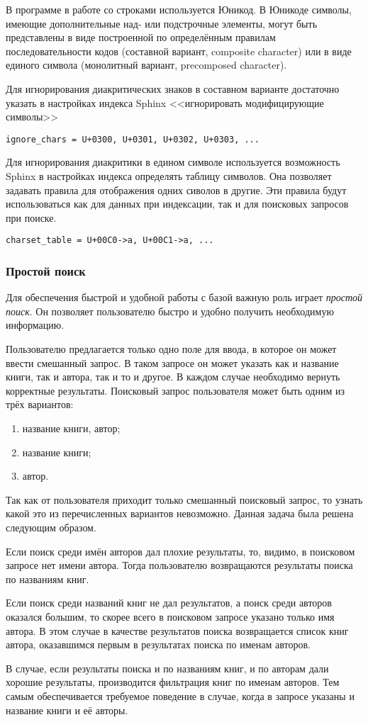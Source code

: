 В программе в работе со строками используется Юникод.
В Юникоде символы, имеющие дополнительные над- или подстрочные элементы, 
могут быть представлены в виде построенной по определённым правилам последовательности кодов (составной вариант, composite character) \cite{compositechar} 
или в виде единого символа (монолитный вариант, precomposed character).

Для игнорирования диакритических знаков в составном варианте достаточно указать в настройках индекса Sphinx <<игнорировать модифицирующие символы>>
\begin{verbatim}
ignore_chars = U+0300, U+0301, U+0302, U+0303, ...
\end{verbatim}
Для игнорирования диакритики в едином символе используется возможность Sphinx в настройках индекса определять таблицу символов. Она позволяет задавать правила для отображения одних сиволов в другие.
Эти правила будут использоваться как для данных при индексации, так и для поисковых запросов при поиске.
\begin{verbatim}
charset_table = U+00C0->a, U+00C1->a, ...
\end{verbatim}

\subsubsection{Простой поиск}

Для обеспечения быстрой и удобной работы с базой важную роль играет {\em простой поиск}.
Он позволяет пользователю быстро и удобно получить необходимую информацию.

Пользователю предлагается только одно поле для ввода, в которое он может ввести смешанный запрос.
В таком запросе он может указать как и название книги, так и автора, так и то и другое.
В каждом случае необходимо вернуть корректные результаты.
Поисковый запрос пользователя может быть одним из трёх вариантов:
\begin{enumerate}
	\item название книги, автор;
	\item название книги;
	\item автор.
\end{enumerate}
Так как от пользователя приходит только смешанный поисковый запрос, то узнать какой это из перечисленных вариантов невозможно.
Данная задача была решена следующим образом.

Если поиск среди имён авторов дал плохие результаты, то, видимо, в поисковом запросе нет имени автора. Тогда пользователю возвращаются результаты поиска по названиям книг.

Если поиск среди названий книг не дал результатов, а поиск среди авторов оказался большим, то скорее всего в поисковом запросе указано только имя автора.
В этом случае в качестве результатов поиска возвращается список книг автора, оказавшимся первым в результатах поиска по именам авторов.

В случае, если результаты поиска и по названиям книг, и по авторам дали хорошие результаты, производится фильтрация книг по именам авторов.
Тем самым обеспечивается требуемое поведение в случае, когда в запросе указаны и название книги и её авторы.






